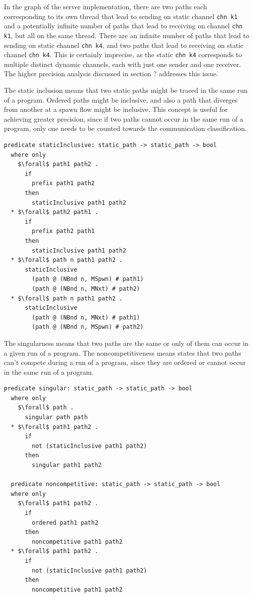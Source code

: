 \documentclass[letterpaper, 11pt]{extarticle}
\begin{document}
In the graph of the server implementation, there are two paths each corresponding to its
own thread that lead
to sending on
static channel \lstinline[language=sugar_lang]{chn k1} and a potentially infinite number of
paths that lead to receiving on
channel \lstinline[language=sugar_lang]{chn k1}, but all on the same thread.
There are an infinite number of paths that lead
to sending on static channel \lstinline[language=sugar_lang]{chn k4}, and two paths
that lead to receiving on static channel
\lstinline[language=sugar_lang]{chn k4}. This is certainly imprecise,
as the static \lstinline[language=sugar_lang]{chn k4} corresponds to
multiple distinct dynamic channels, each with just one sender and one receiver.  The higher
precision analysis discussed in section ? addresses this issue.

The static inclusion means that two static paths might be traced in
the same run of a program. Ordered paths might be inclusive, and also a path that diverges
from another at a spawn flow might be inclusive. This concept is useful for achieving
greater precision, since if two paths cannot occur in the same run of a program, only one needs
to be counted towards the communication classification. 

\begin{lstlisting}[language=logic, mathescape]
  predicate staticInclusive: static_path -> static_path -> bool
  where only
    $\forall$ path1 path2 .
      if
        prefix path1 path2
      then
        staticInclusive path1 path2
  * $\forall$ path2 path1 .
      if
        prefix path2 path1
      then
        staticInclusive path1 path2
  * $\forall$ path n path1 path2 .
      staticInclusive
        (path @ (NBnd n, MSpwn) # path1)
        (path @ (NBnd n, MNxt) # path2)
  * $\forall$ path n path1 path2 .
      staticInclusive
        (path @ (NBnd n, MNxt) # path1)
        (path @ (NBnd n, MSpwn) # path2)
\end{lstlisting}

The singularness means that two paths are the same or only of them can occur in a given run of
a program. The noncompetitiveness means states that two paths can't compete during a run of a
program, since they are ordered or cannot occur in the same run of a program.

\begin{lstlisting}[language=logic, mathescape]
  predicate singular: static_path -> static_path -> bool
  where only
    $\forall$ path .
      singular path path
  * $\forall$ path1 path2 .
      if
        not (staticInclusive path1 path2)
      then
        singular path1 path2

  predicate noncompetitive: static_path -> static_path -> bool
  where only
    $\forall$ path1 path2 .
      if
        ordered path1 path2
      then
        noncompetitive path1 path2
  * $\forall$ path1 path2 .
      if
        not (staticInclusive path1 path2)
      then
        noncompetitive path1 path2
\end{lstlisting}
\end{document}
